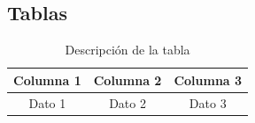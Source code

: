
\subsection{Tablas}

\begin{table}[H]
    \centering
    \begin{tabular}{|c|c|c|}
        \hline
        Columna 1 & Columna 2 & Columna 3 \\
        \hline
        Dato 1 & Dato 2 & Dato 3 \\
        \hline
    \end{tabular}
    \caption{Descripción de la tabla}
    \label{tab:etiqueta}
\end{table}
